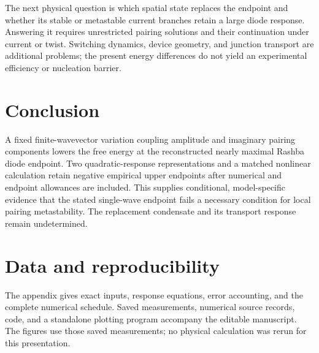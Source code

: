\documentclass[11pt,a4paper]{article}
\begin{document}
The next physical question is which spatial state replaces the endpoint and whether its stable or metastable current branches retain a large diode response. Answering it requires unrestricted pairing solutions and their continuation under current or twist. Switching dynamics, device geometry, and junction transport are additional problems; the present energy differences do not yield an experimental efficiency or nucleation barrier.

\section{Conclusion}
A fixed finite-wavevector variation coupling amplitude and imaginary pairing components lowers the free energy at the reconstructed nearly maximal Rashba diode endpoint. Two quadratic-response representations and a matched nonlinear calculation retain negative empirical upper endpoints after numerical and endpoint allowances are included. This supplies conditional, model-specific evidence that the stated single-wave endpoint fails a necessary condition for local pairing metastability. The replacement condensate and its transport response remain undetermined.

\section*{Data and reproducibility}
The appendix gives exact inputs, response equations, error accounting, and the complete numerical schedule. Saved measurements, numerical source records, code, and a standalone plotting program accompany the editable manuscript. The figures use those saved measurements; no physical calculation was rerun for this presentation.

\FloatBarrier
\appendix

\begingroup\raggedright


\endgroup
\end{document}
